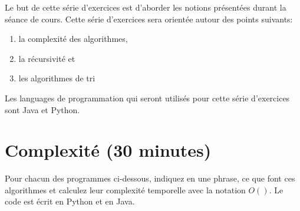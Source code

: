 




\ShowSolutiontrue
\ShowConseiltrue
\titre
{}

Le but de cette série d'exercices est d'aborder les notions présentées durant la séance de cours. Cette série d'exercices sera orientée autour des points suivants:
\begin{enumerate}
    \item la complexité des algorithmes,
    \item la récursivité et
    \item les algorithmes de tri
\end{enumerate}

Les languages de programmation qui seront utilisés pour cette série d'exercices sont Java et Python.


\section{Complexité (30 minutes)}

Pour chacun des programmes ci-dessous, indiquez en une phrase, ce que font ces algorithmes et calculez leur complexité temporelle avec la notation $O( )$. Le code est écrit en Python et en Java. \\

